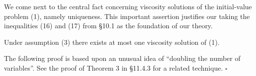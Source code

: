 We come next to the central fact concerning viscosity solutions of the initial-value problem (1), namely uniqueness. This important assertion justifies our taking the inequalities (16) and (17) from \S10.1 as the foundation of our theory.

\begin{theorem}
\label{thm:uniqueness-viscosity-solution-hj}
Under assumption (3) there exists at most one viscosity solution of (1).
\end{theorem}

\begin{remark}
\label{rem:doubling-variables-technique}
The following proof is based upon an unusual idea of ``doubling the number of variables''. See the proof of Theorem 3 in \S11.4.3 for a related technique. $\square$
\end{remark}

